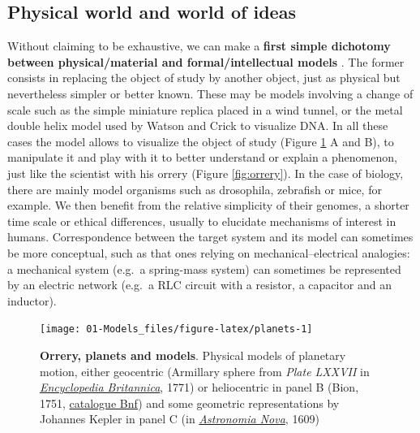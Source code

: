 \documentclass[a4paper,12pt,twoside,onecolumn,openright,final,oldfontcommands]{memoir}
\begin{document}
\subsection{Physical world and world of
ideas}\label{physical-world-and-world-of-ideas}

Without claiming to be exhaustive, we can make a \textbf{first simple
dichotomy between physical/material and formal/intellectual models}
\citep{rosenblueth1945role}. The former consists in replacing the object
of study by another object, just as physical but nevertheless simpler or
better known. These may be models involving a change of scale such as
the simple miniature replica placed in a wind tunnel, or the metal
double helix model used by Watson and Crick to visualize DNA. In all
these cases the model allows to visualize the object of study (Figure
\ref{fig:planets} A and B), to manipulate it and play with it to better
understand or explain a phenomenon, just like the scientist with his
orrery (Figure \ref{fig:orrery}). In the case of biology, there are
mainly model organisms such as drosophila, zebrafish or mice, for
example. We then benefit from the relative simplicity of their genomes,
a shorter time scale or ethical differences, usually to elucidate
mechanisms of interest in humans. Correspondence between the target
system and its model can sometimes be more conceptual, such as that ones
relying on mechanical--electrical analogies: a mechanical system (e.g.~a
spring-mass system) can sometimes be represented by an electric network
(e.g.~a RLC circuit with a resistor, a capacitor and an inductor).

\begin{figure}

{\centering \texttt{[image: 01-Models\_files/figure-latex/planets-1]} 

}

\caption[Orrery, planets and models]{\textbf{Orrery, planets and models}. Physical
models of planetary motion, either geocentric (Armillary sphere from
\emph{Plate LXXVII} in
\href{https://commons.wikimedia.org/wiki/File:EB1711_Armillary_Sphere.png}{\emph{Encyclopedia
Britannica}}, 1771) or heliocentric in panel B (Bion, 1751,
\href{https://gallica.bnf.fr/ark:/12148/btv1b2600252q/f8.item.r=Bion}{catalogue
Bnf}) and some geometric representations by Johannes Kepler in panel C
(in
\href{https://commons.wikimedia.org/wiki/File:Kepler_astronomia_nova.jpg}{\emph{Astronomia
Nova}}, 1609)}\label{fig:planets}
\end{figure}
\end{document}
